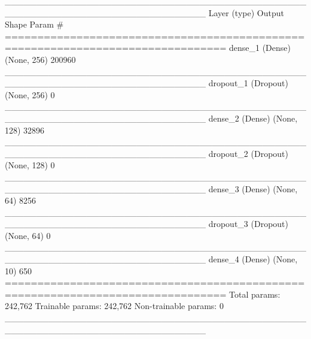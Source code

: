 \documentclass[
  12pt,
]{krantz}
\makeatletter
\newenvironment{Shaded}{\begin{snugshade}}{\end{snugshade}}
\newcommand{\NormalTok}[1]{#1}
\newenvironment{kframe}{%
\medskip{}
\setlength{\fboxsep}{.8em}
 \def\at@end@of@kframe{}%
 \ifinner\ifhmode%
  \def\at@end@of@kframe{\end{minipage}}%
  \begin{minipage}{\columnwidth}%
 \fi\fi%
 \def\FrameCommand##1{\hskip\@totalleftmargin \hskip-\fboxsep
 \colorbox{shadecolor}{##1}\hskip-\fboxsep
     \hskip-\linewidth \hskip-\@totalleftmargin \hskip\columnwidth}%
 \MakeFramed {\advance\hsize-\width
   \@totalleftmargin\z@ \linewidth\hsize
   \@setminipage}}%
 {\par\unskip\endMakeFramed%
 \at@end@of@kframe}
\renewenvironment{Shaded}{\begin{kframe}}{\end{kframe}}
\makeatother
\begin{document}
\begin{Shaded}
\begin{Highlighting}[]
\NormalTok{\_\_\_\_\_\_\_\_\_\_\_\_\_\_\_\_\_\_\_\_\_\_\_\_\_\_\_\_\_\_\_\_\_\_\_\_\_\_\_\_\_\_\_\_\_\_\_\_\_\_\_\_\_\_\_\_\_\_\_\_\_\_\_\_\_\_\_\_\_\_\_\_\_\_\_\_\_\_\_\_}
\NormalTok{Layer (type)                        Output Shape                    Param \#     }
\NormalTok{================================================================================}
\NormalTok{dense\_1 (Dense)                     (None, 256)                     200960      }
\NormalTok{\_\_\_\_\_\_\_\_\_\_\_\_\_\_\_\_\_\_\_\_\_\_\_\_\_\_\_\_\_\_\_\_\_\_\_\_\_\_\_\_\_\_\_\_\_\_\_\_\_\_\_\_\_\_\_\_\_\_\_\_\_\_\_\_\_\_\_\_\_\_\_\_\_\_\_\_\_\_\_\_}
\NormalTok{dropout\_1 (Dropout)                 (None, 256)                     0           }
\NormalTok{\_\_\_\_\_\_\_\_\_\_\_\_\_\_\_\_\_\_\_\_\_\_\_\_\_\_\_\_\_\_\_\_\_\_\_\_\_\_\_\_\_\_\_\_\_\_\_\_\_\_\_\_\_\_\_\_\_\_\_\_\_\_\_\_\_\_\_\_\_\_\_\_\_\_\_\_\_\_\_\_}
\NormalTok{dense\_2 (Dense)                     (None, 128)                     32896       }
\NormalTok{\_\_\_\_\_\_\_\_\_\_\_\_\_\_\_\_\_\_\_\_\_\_\_\_\_\_\_\_\_\_\_\_\_\_\_\_\_\_\_\_\_\_\_\_\_\_\_\_\_\_\_\_\_\_\_\_\_\_\_\_\_\_\_\_\_\_\_\_\_\_\_\_\_\_\_\_\_\_\_\_}
\NormalTok{dropout\_2 (Dropout)                 (None, 128)                     0           }
\NormalTok{\_\_\_\_\_\_\_\_\_\_\_\_\_\_\_\_\_\_\_\_\_\_\_\_\_\_\_\_\_\_\_\_\_\_\_\_\_\_\_\_\_\_\_\_\_\_\_\_\_\_\_\_\_\_\_\_\_\_\_\_\_\_\_\_\_\_\_\_\_\_\_\_\_\_\_\_\_\_\_\_}
\NormalTok{dense\_3 (Dense)                     (None, 64)                      8256        }
\NormalTok{\_\_\_\_\_\_\_\_\_\_\_\_\_\_\_\_\_\_\_\_\_\_\_\_\_\_\_\_\_\_\_\_\_\_\_\_\_\_\_\_\_\_\_\_\_\_\_\_\_\_\_\_\_\_\_\_\_\_\_\_\_\_\_\_\_\_\_\_\_\_\_\_\_\_\_\_\_\_\_\_}
\NormalTok{dropout\_3 (Dropout)                 (None, 64)                      0           }
\NormalTok{\_\_\_\_\_\_\_\_\_\_\_\_\_\_\_\_\_\_\_\_\_\_\_\_\_\_\_\_\_\_\_\_\_\_\_\_\_\_\_\_\_\_\_\_\_\_\_\_\_\_\_\_\_\_\_\_\_\_\_\_\_\_\_\_\_\_\_\_\_\_\_\_\_\_\_\_\_\_\_\_}
\NormalTok{dense\_4 (Dense)                     (None, 10)                      650         }
\NormalTok{================================================================================}
\NormalTok{Total params: 242,762}
\NormalTok{Trainable params: 242,762}
\NormalTok{Non{-}trainable params: 0}
\NormalTok{\_\_\_\_\_\_\_\_\_\_\_\_\_\_\_\_\_\_\_\_\_\_\_\_\_\_\_\_\_\_\_\_\_\_\_\_\_\_\_\_\_\_\_\_\_\_\_\_\_\_\_\_\_\_\_\_\_\_\_\_\_\_\_\_\_\_\_\_\_\_\_\_\_\_\_\_\_\_\_\_}
\end{Highlighting}
\end{Shaded}
\end{document}

